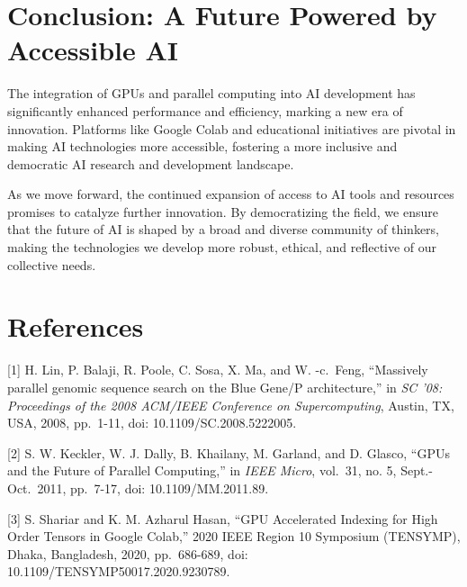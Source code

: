 \documentclass[
  journal,
]{IEEEtran}%
\begin{document}
\section{Conclusion: A Future Powered by Accessible
AI}\label{conclusion-a-future-powered-by-accessible-ai}

The integration of GPUs and parallel computing into AI development has
significantly enhanced performance and efficiency, marking a new era of
innovation. Platforms like Google Colab and educational initiatives are
pivotal in making AI technologies more accessible, fostering a more
inclusive and democratic AI research and development landscape.

As we move forward, the continued expansion of access to AI tools and
resources promises to catalyze further innovation. By democratizing the
field, we ensure that the future of AI is shaped by a broad and diverse
community of thinkers, making the technologies we develop more robust,
ethical, and reflective of our collective needs.

\section{References}\label{references}

{[}1{]} H. Lin, P. Balaji, R. Poole, C. Sosa, X. Ma, and W. -c.~Feng,
``Massively parallel genomic sequence search on the Blue Gene/P
architecture,'' in \emph{SC '08: Proceedings of the 2008 ACM/IEEE
Conference on Supercomputing}, Austin, TX, USA, 2008, pp.~1-11, doi:
10.1109/SC.2008.5222005.

{[}2{]} S. W. Keckler, W. J. Dally, B. Khailany, M. Garland, and D.
Glasco, ``GPUs and the Future of Parallel Computing,'' in \emph{IEEE
Micro}, vol.~31, no. 5, Sept.-Oct.~2011, pp.~7-17, doi:
10.1109/MM.2011.89.

{[}3{]} S. Shariar and K. M. Azharul Hasan, ``GPU Accelerated Indexing
for High Order Tensors in Google Colab,'' 2020 IEEE Region 10 Symposium
(TENSYMP), Dhaka, Bangladesh, 2020, pp.~686-689, doi:
10.1109/TENSYMP50017.2020.9230789.


\ifCLASSOPTIONcaptionsoff
  \newpage
\fi



\pagebreak[3]
\end{document}
